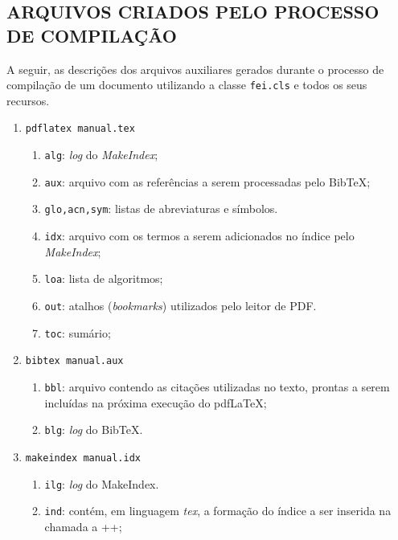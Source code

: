 \documentclass[xindy,rascunho]{fei}
\begin{document}
\begin{teorema}
	
	
	\appendix
	
	\chapter{ARQUIVOS CRIADOS PELO PROCESSO DE COMPILAÇÃO} \label{chap:arquivos}
	
	A seguir, as descrições dos arquivos auxiliares gerados durante o processo de compilação de um documento utilizando a classe \texttt{fei.cls} e todos os seus recursos.
		
	\begin{enumerate}
	
	\item\verb+pdflatex manual.tex+
	\begin{enumerate}
	\item \texttt{alg}: \emph{log} do \emph{MakeIndex};
	\item \texttt{aux}: arquivo com as referências a serem processadas pelo Bib\TeX;
	\item \texttt{glo,acn,sym}: listas de abreviaturas e símbolos.
	\item \texttt{idx}: arquivo com os termos a serem adicionados no índice pelo \emph{MakeIndex};
	\item \texttt{loa}: lista de algoritmos;
	\item \texttt{out}: atalhos (\emph{bookmarks}) utilizados pelo leitor de PDF.
	\item \texttt{toc}: sumário;
	\end{enumerate}	
	
	\item\verb+bibtex manual.aux+
	\begin{enumerate}
	\item \texttt{bbl}: arquivo contendo as citações utilizadas no texto, prontas a serem incluídas na próxima execução do pdf\LaTeX;
	\item \texttt{blg}: \emph{log} do Bib\TeX.
	\end{enumerate}	
	
	\item\verb+makeindex manual.idx+
	\begin{enumerate}
	\item \texttt{ilg}: \emph{log} do MakeIndex.
	\item \texttt{ind}: contém, em linguagem \emph{tex}, a formação do índice a ser inserida na chamada a \latexinline+\printindex+;
	\end{enumerate}	
	

\end{enumerate}
\end{teorema}
\end{document}

